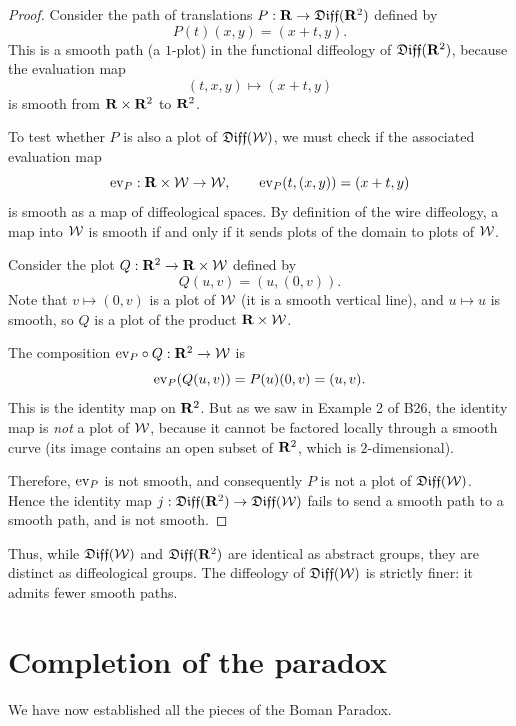 \begin{proof}
  Consider the path of translations $P: \mathbf{R} \to \mathfrak{Diff}(\mathbf{R}^2)$ defined by
  $$%
    P(t)(x,y) = (x + t, y).
    $$%
  This is a smooth path (a $1$-plot) in the functional diffeology of $\mathfrak{Diff}(\mathbf{R}^2)$,
  because the evaluation map
  $$%
    (t,x,y) \mapsto (x+t, y)
    $$%
  is smooth from $\mathbf{R} \times \mathbf{R}^2$ to $\mathbf{R}^2$.
  
  To test whether $P$ is also a plot of $\mathfrak{Diff}(\mathcal{W})$,
  we must check if the associated evaluation map
  $$%
    \Eval_P: \RR \times \cW \to \cW,\qquad \Eval_P(t, (x,y)) = (x+t, y)
    $$%
  is smooth as a map of diffeological spaces.
  By definition of the wire diffeology,
  a map into $\mathcal{W}$ is smooth if and only if it sends plots of the domain to plots of $\mathcal{W}$.
  
  Consider the plot $Q: \mathbf{R}^2 \to \mathbf{R} \times \mathcal{W}$ defined by
  $$%
    Q(u,v) = (u, (0,v)).
    $$%
  Note that $v \mapsto (0,v)$ is a plot of $\mathcal{W}$ (it is a smooth vertical line),
  and $u \mapsto u$ is smooth,
  so $Q$ is a plot of the product $\mathbf{R} \times \mathcal{W}$.
  
  The composition ${\operatorname{ev}}_P \circ Q: \mathbf{R}^2 \to \mathcal{W}$ is
  $$%
    \Eval_P(Q(u,v)) = P(u)(0,v) = (u, v).
    $$%
  This is the identity map on $\mathbf{R}^2$.
  But as we saw in Example 2 of B26,
  the identity map is \emph{not} a plot of $\mathcal{W}$,
  because it cannot be factored locally through a smooth curve
  (its image contains an open subset of $\mathbf{R}^2$, which is $2$-dimensional).
  
  Therefore,
  ${\operatorname{ev}}_P$ is not smooth,
  and consequently $P$ is not a plot of $\mathfrak{Diff}(\mathcal{W})$.
  Hence the identity map $j: \mathfrak{Diff}(\mathbf{R}^2) \to \mathfrak{Diff}(\mathcal{W})$ fails to send a smooth path to a smooth path,
  and is not smooth.
\end{proof}

Thus,
while $\mathfrak{Diff}(\mathcal{W})$ and $\mathfrak{Diff}(\mathbf{R}^2)$ are identical as abstract groups,
they are distinct as diffeological groups.
The diffeology of $\mathfrak{Diff}(\mathcal{W})$ is strictly finer:
it admits fewer smooth paths.

\section{Completion of the paradox}

We have now established all the pieces of the Boman Paradox.

